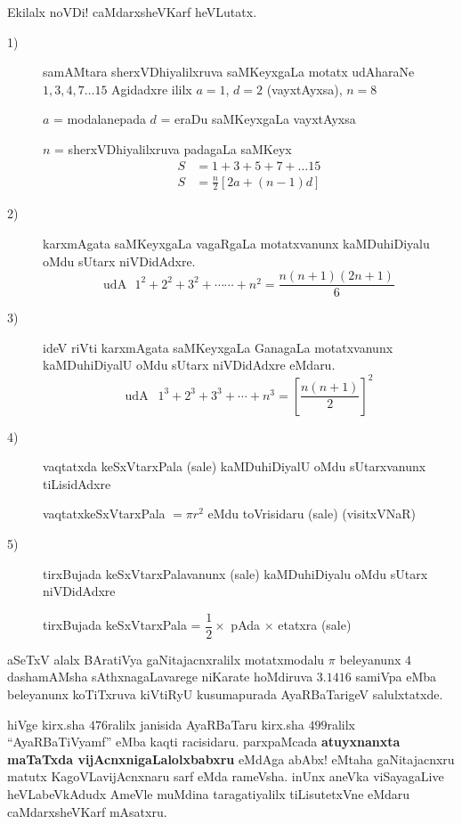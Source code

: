 Ekilalx noVDi! caMdarxsheVKarf heVLutatx.
\begin{description}
\item[{\rm 1})] samAMtara sherxVDhiyalilxruva saMKeyxgaLa motatx udAharaNe $1, 3, 4, 7 \ldots 15$ Agidadxre ililx $a=1$, $d=2$ (vayxtAyxsa), $n=8$

  $a$ = modalanepada $d$ = eraDu saMKeyxgaLa vayxtAyxsa

  $n$ = sherxVDhiyalilxruva padagaLa saMKeyx
  \begin{align*}
    S &= 1+3+5+7+ \ldots 15\\
    S &= \frac{n}{2} \left[2a+(n-1)d \right]
  \end{align*}

\item[{\rm 2})] karxmAgata saMKeyxgaLa vagaRgaLa motatxvanunx kaMDuhiDiyalu oMdu sUtarx niVDidAdxre.
  $$
\text{udA} ~~~ 1^2 + 2^2 + 3^2 + \cdots \cdots + n^2 = \frac{n (n+1) (2n+1)}{6}
$$

\item[{\rm 3})] ideV riVti karxmAgata saMKeyxgaLa GanagaLa motatxvanunx kaMDuhiDiyalU oMdu sUtarx niVDidAdxre eMdaru.
$$
\text{udA } ~~1^3 +2^3+3^3 + \cdots +n^3 = \left[\frac{n(n+1)}{2}\right]^2
$$

\newpage

\item[{\rm 4})] vaqtatxda keSxVtarxPala (sale) kaMDuhiDiyalU oMdu sUtarxvanunx tiLisidAdxre

  vaqtatxkeSxVtarxPala $=\pi r^2$ eMdu toVrisidaru (sale) (visitxVNaR)
   

\item[{\rm 5})] tirxBujada keSxVtarxPalavanunx (sale) kaMDuhiDiyalu oMdu sUtarx niVDidAdxre

  tirxBujada keSxVtarxPala = $\dfrac{1}{2} \times $ pAda $\times$ etatxra (sale)
\end{description}

aSeTxV alalx BAratiVya gaNitajacnxralilx motatxmodalu $\pi$ beleyanunx $4$ dashamAMsha sAthxnagaLavarege niKarate hoMdiruva $3.1416$ samiVpa eMba beleyanunx koTiTxruva kiVtiRyU kusumapurada AyaRBaTarigeV salulxtatxde.

hiVge kirx.sha $476$ralilx janisida AyaRBaTaru kirx.sha $499$ralilx ``AyaRBaTiVyamf'' eMba kaqti racisidaru. parxpaMcada {\bf atuyxnanxta maTaTxda vijAcnxnigaLalolxbabxru} eMdAga abAbx! eMtaha gaNitajacnxru matutx KagoVLavijAcnxnaru sarf eMda rameVsha. inUnx aneVka viSayagaLive heVLabeVkAdudx AmeVle muMdina taragatiyalilx tiLisutetxVne eMdaru caMdarxsheVKarf mAsatxru.

